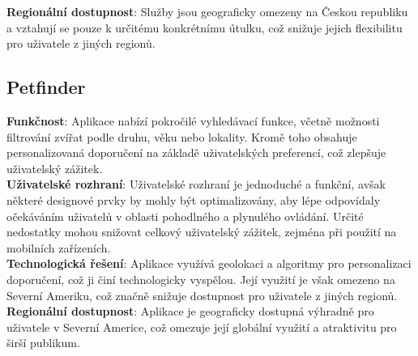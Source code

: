 \documentclass[12pt,a4paper]{report}
\begin{document}
\noindent \textbf{Regionální dostupnost}: Služby jsou geograficky omezeny na Českou republiku a vztahují se pouze k určitému konkrétnímu útulku, což snižuje jejich flexibilitu pro uživatele z jiných regionů.\\

\subsection{Petfinder}

\noindent \textbf{Funkčnost}: Aplikace nabízí pokročilé vyhledávací funkce, včetně možnosti filtrování zvířat podle druhu, věku nebo lokality. Kromě toho obsahuje personalizovaná doporučení na základě uživatelských preferencí, což zlepšuje uživatelský zážitek.\\

\noindent \textbf{Uživatelské rozhraní}: Uživatelské rozhraní je jednoduché a funkční, avšak některé designové prvky by mohly být optimalizovány, aby lépe odpovídaly očekáváním uživatelů v oblasti pohodlného a plynulého ovládání. Určité nedostatky mohou snižovat celkový uživatelský zážitek, zejména při použití na mobilních zařízeních.\\

\noindent \textbf{Technologická řešení}: Aplikace využívá geolokaci a algoritmy pro personalizaci doporučení, což ji činí technologicky vyspělou. Její využití je však omezeno na Severní Ameriku, což značně snižuje dostupnost pro uživatele z jiných regionů.\\

\noindent \textbf{Regionální dostupnost}: Aplikace je geograficky dostupná výhradně pro uživatele v Severní Americe, což omezuje její globální využití a atraktivitu pro širší publikum.\\
\end{document}
